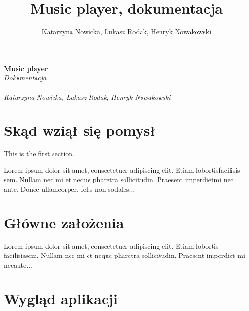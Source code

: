\documentclass{article}
\title{Music player, dokumentacja}
\author{Katarzyna Nowicka, Łukasz Rodak, Henryk Nowakowski}
\date{ }
\begin{document}
\begin{titlepage}

{\selectfont

   \begin{center}
      \Huge\textbf{Music player}\\
      \huge\textit{Dokumentacja}\\~\\
      \large\textit{Katarzyna Nowicka, Łukasz Rodak, Henryk Nowakowski}
      
   \end{center}
   
   }
\end{titlepage}


\tableofcontents

\newpage
 
\section{Skąd wziął się pomysł}
 
This is the first section.
 
Lorem  ipsum  dolor  sit  amet,  consectetuer  adipiscing  
elit.   Etiam  lobortisfacilisis sem.  Nullam nec mi et 
neque pharetra sollicitudin.  Praesent imperdietmi nec ante. 
Donec ullamcorper, felis non sodales...
 
 

 
\section{Główne założenia}
 
Lorem ipsum dolor sit amet, consectetuer adipiscing elit.  
Etiam lobortis facilisissem.  Nullam nec mi et neque pharetra 
sollicitudin.  Praesent imperdiet mi necante...

\section{Wygląd aplikacji}
 
\end{document}
